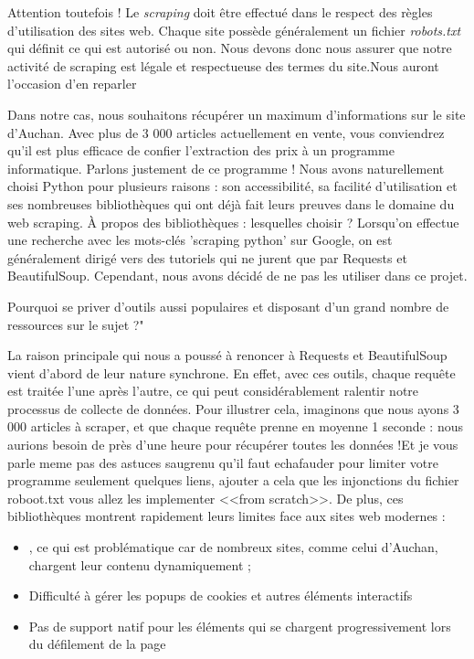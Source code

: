 \documentclass[small]{zmdocument}
\begin{document}
\begin{Warning}
Attention toutefois ! Le \textit{scraping} doit être effectué dans le respect des règles d'utilisation des sites web. Chaque site possède généralement un fichier \textit{robots.txt} qui définit ce qui est autorisé ou non. Nous devons donc nous assurer que notre activité de scraping est légale et respectueuse des termes du site.Nous auront l'occasion d'en reparler
\end{Warning}

Dans notre cas, nous souhaitons récupérer un maximum d'informations sur le site d'Auchan. Avec plus de 3 000 articles actuellement en vente, vous conviendrez qu'il est plus efficace de confier l'extraction des prix à un programme informatique.
Parlons justement de ce programme ! Nous avons naturellement choisi Python pour plusieurs raisons : son accessibilité, sa facilité d'utilisation et ses nombreuses bibliothèques qui ont déjà fait leurs preuves dans le domaine du web scraping.
À propos des bibliothèques : lesquelles choisir ? Lorsqu'on effectue une recherche avec les mots-clés 'scraping python' sur Google, on est généralement dirigé vers des tutoriels qui ne jurent que par Requests et BeautifulSoup. Cependant, nous avons décidé de ne pas les utiliser dans ce projet.
\begin{Question}
Pourquoi se priver d'outils aussi populaires et disposant d'un grand nombre de ressources sur le sujet ?"
\end{Question}

La raison principale qui nous a poussé à renoncer à Requests et BeautifulSoup vient d'abord de leur nature synchrone. En effet, avec ces outils, chaque requête est traitée l'une après l'autre, ce qui peut considérablement ralentir notre processus de collecte de données. Pour illustrer cela, imaginons que nous ayons 3 000 articles à scraper, et que chaque requête prenne en moyenne 1 seconde : nous aurions besoin de près d'une heure pour récupérer toutes les données !Et je vous parle meme pas des astuces saugrenu qu'il faut echafauder pour limiter votre programme seulement quelques liens, ajouter a cela que les injonctions du fichier roboot.txt vous allez les implementer <<from scratch>>.
De plus, ces bibliothèques montrent rapidement leurs limites face aux sites web modernes :

\begin{itemize}
\item {} , ce qui est problématique car de nombreux sites, comme celui d'Auchan, chargent leur contenu dynamiquement ;
\item Difficulté à gérer les popups de cookies et autres éléments interactifs
\item Pas de support natif pour les éléments qui se chargent progressivement lors du défilement de la page
\end{itemize}
\end{document}
